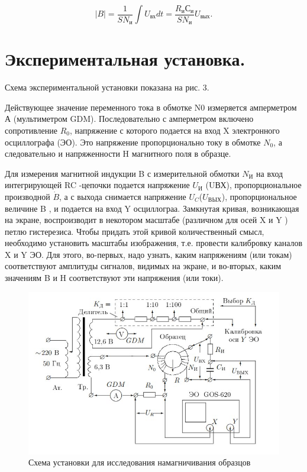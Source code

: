 \documentclass[12pt]{kiarticle}
\begin{document}
	$$ |B|=\dfrac{1}{SN_{и}}\int U_{вх}dt=\dfrac{R_{и}С_{и}}{SN_{и}}U_{вых}.$$
	
	\section{Экспериментальная установка.}
	Схема экспериментальной установки показана на рис. 3.
	
	Действующее значение переменного тока в обмотке N0 измеряется амперметром А (мультиметром GDM). Последовательно с амперметром включено сопротивление $R_{0}$, напряжение с которого подается на вход X электронного осциллографа (ЭО). Это напряжение пропорционально току в обмотке $N_{0}$, а следовательно и напряженности H магнитного поля в образце.
	
	Для измерения магнитной индукции B с измерительной обмотки $N_{И}$ на вход интегрирующей RC -цепочки подается напряжение $U_{И}$ (UВХ), пропорциональное производной $\dot{B}$, а с выхода снимается напряжение $U_{C}$($U_{ВЫХ}$), пропорциональное
	величине B , и подается на вход Y осциллограа.
	Замкнутая кривая, возникающая на экране, воспроизводит в некотором масштабе (различном для осей X и Y ) петлю гистерезиса. Чтобы придать этой кривой количественный смысл, необходимо установить масштабы изображения, т.е. провести калибровку каналов X и Y ЭО. Для этого, во-первых, надо узнать, каким напряжениям (или токам) соответствуют амплитуды сигналов, видимых на экране, и во-вторых,  каким значениям B и H соответствуют эти напряжения
	(или токи).
	
	\begin{figure}[h!]
		\centering
		\includegraphics[width=\linewidth]{gist.jpg}
		\caption{Схема установки для исследования намагничивания образцов}
		\label{fig:Holl2}
	\end{figure}
  
\end{document}

